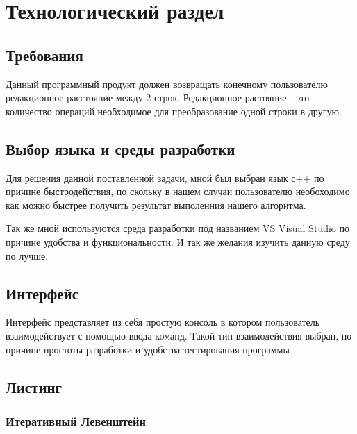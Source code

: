 \documentclass[a4paper, 14pt]{article}
\begin{document}
	\newpage
	\section{Технологический раздел}
	
	\subsection{Требования}
	
	Данный программный продукт должен возвращать конечному пользователю редакционное расстояние между 2 строк. Редакционное растояние - это количество операций необходимое для преобразование одной строки в другую.

	
	\subsection{Выбор языка и среды разработки}
	
	Для решения данной поставленной задачи, мной был выбран язык с++ по причине быстродействия, по скольку в нашем случаи пользователю необоходимо как можно быстрее получить результат выполенния нашего алгоритма.
	
	Так же мной используются среда разработки под названием VS Visual Studio по причине удобства и функциональности. И так же желания изучить данную среду по лучше.
	
	\subsection{Интерфейс}
	
	Интерфейс представляет из себя простую консоль в котором пользователь взаимодействует с помощью ввода команд. Такой тип взаимодействия выбран, по причине простоты разработки и удобства тестирования программы
	
	\subsection{Листинг}
	
	\subsubsection{Итеративный Левенштейн}
	
\end{document}
